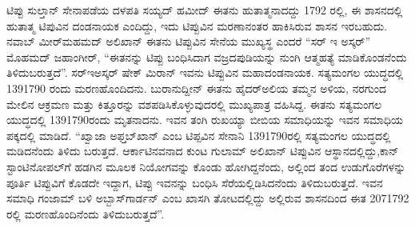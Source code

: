 ಟಿಪ್ಪು ಸುಲ್ತಾನ್​ ಸೇನಾಪಡೆಯ ದಳಪತಿ ಸಯ್ಯದ್​ ಹಮೀದ್​\enginline{-} ಈತನು ಹುತಾತ್ಮನಾದದ್ದು 1792 ರಲ್ಲಿ, ಈ ಶಾಸನದಲ್ಲಿ ಹುತಾತ್ಮ ಟಿಪುವಿನ ದಂಡನಾಯಕ ಎಂದಿದ್ದು, ಇದು ಟಿಪ್ಪುವಿನ ಮರಣಾನಂತರ ಹಾಕಿಸಿರುವ ಶಾಸನ ಇರಬಹುದು. ನವಾಬ್​ ಮೀರ್​ಮಹಮದ್​ ಅಲಿಖಾನ್​\enginline{-} ಈತನು ಟಿಪ್ಪುವಿನ ಸೇನೆಯ ಮುಖ್ಯಸ್ಥ ಎಂದರೆ “ಸರ್​ ಇ ಅಸ್ಕರ್​” ಮೊಹಮದ್​ ಜಹಾಂಗೀರ್​, “ಈತನನ್ನು ಟಿಪ್ಪು ಬಂಧಿಸಿದಾಗ ವಜ್ರದಪುಡಿಯನ್ನು ನುಂಗಿ ಆತ್ಮಹತ್ಯೆ ಮಾಡಿಕೊಂಡನೆಂದು ತಿಳಿದು\-ಬರುತ್ತದೆ”. ಸರ್​\enginline{-}ಇ\enginline{-}ಅಸ್ಕರ್​ ಷೇಕ್​ ಮಿರಾನ್​\enginline{-} ಇವನು ಟಿಪ್ಪುವಿನ ಮಹಾದಂಡನಾಯಕ. ಸತ್ಯಮಂಗಲ ಯುದ್ಧದಲ್ಲಿ 13\enginline{-}9\enginline{-}1790 ರಂದು ಮರಣಹೊಂದಿದನು. ಬುರಾನುದ್ದೀನ್​\enginline{-} ಈತನು ಹೈದರ್​ಅಲಿಯ ತಮ್ಮನ ಅಳಿಯ, ನರಗುಂದ ಮೇಲಿನ ಆಕ್ರಮಣ ಮತ್ತು ಕಿತ್ತೂರನ್ನು ವಶಪಡಿಸಿಕೊಳ್ಳುವುದರಲ್ಲಿ ಮುಖ್ಯಪಾತ್ರ ವಹಿಸಿದ್ದ. ಈತನು ಸತ್ಯಮಂಗಲ ಯುದ್ಧದಲ್ಲಿ 13\enginline{-}9\enginline{-}1790ರಂದು ಮೃತನಾದನು. ಇವನ ತಂಗಿ ರುಖಯ್ಯಾ ಬೀಬಿಯ ಸಮಾಧಿಯನ್ನು ಇವನ ಸಮಾಧಿಯ ಪಕ್ಕದಲ್ಲಿ ಮಾಡಿದೆ. “ಖ್ವಾಜಾ ಅಫ್ತಬ್​ಖಾನ್​ ಎಂಬ ಟಿಪ್ಪವಿನ ಸೇನಾನಿ 13\enginline{-}9\enginline{-}1790ರಲ್ಲಿ ಸತ್ಯಮಂಗಲ ಯುದ್ಧದಲ್ಲಿ ಮಡಿದನೆಂದು ತಿಳಿದು ಬರುತ್ತದೆ. ಆರ್ಕಾಟಿನವನಾದ ಕುಂಟ ಗುಲಾಮ್ ಅಲಿಖಾನ್​ ಟಿಪ್ಪುವಿನ ಆಸ್ಥಾನದಲ್ಲಿದ್ದು,\break ಕಾನ್​ಸ್ಟಾಂಟಿನೋಪಲ್​ಗೆ ಹಡಗಿನ ಮೂಲಕ ನಿಯೋಗವನ್ನು ಕೊಂಡು ಹೋಗಿದ್ದನೆಂದು, ಅಲ್ಲಿಂದ ತಂದ ಉಡುಗೊರೆಗಳನ್ನು ಪೂರ್ತಿ ಟಿಪ್ಪುವಿಗೆ ಕೊಡದೇ ಇದ್ದಾಗ, ಟಿಪ್ಪು ಇವನನ್ನು ಬಂಧಿಸಿ ಸೆರೆಯಲ್ಲಿಡಿಸಿದನೆಂದು ತಿಳಿದುಬರುತ್ತದೆ. ಇವನ ಸಮಾಧಿ ಗಂಜಾಮ್ ಬಳಿ ಅಬ್ಬಾಸ್​ಗಾರ್ಡನ್​ ಎಂಬ ಖಾಸಗಿ ತೋಟದಲ್ಲಿದ್ದು ಅಲ್ಲಿರುವ ಶಾಸನದಿಂದ ಈತ 20\enginline{-}7\enginline{-}1792 ರಲ್ಲಿ ಮರಣಹೊಂದಿನೆಂದು ತಿಳಿದುಬರುತ್ತದೆ”.

